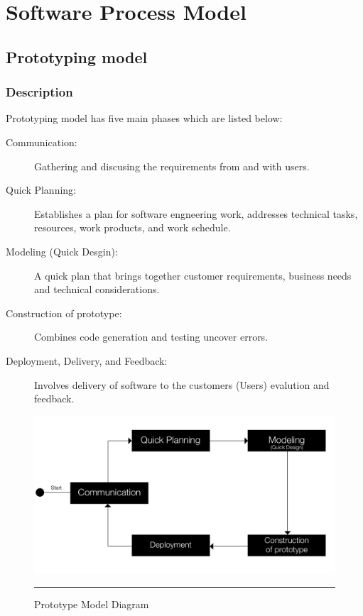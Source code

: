 \chapter{Software Process Model} 

\label{Chapter5} 


\doublespacing


\section{Prototyping model}
\subsection{Description}
Prototyping model has five main phases which are listed below:
\begin{description}
	\item[Communication:] Gathering and discusing the requirements from and with users.
	\item[Quick Planning:] Establishes a plan for software engneering work, addresses technical tasks, resources, work products, and work schedule.
	\item[Modeling (Quick Desgin):] A quick plan that brings together customer requirements, business needs and technical considerations.
	\item[Construction of prototype:] Combines code generation and testing uncover errors.
	\item[Deployment, Delivery, and Feedback:] Involves delivery of software to the customers (Users) evalution and feedback.
\end{description}

\begin{figure}[H]
	\centering
	\includegraphics[scale=0.5]{Figures/PrototypingModel.png}
	\rule{35em}{0.5pt}
	\caption[Prototype Model Diagram]{Prototype Model Diagram}
\end{figure}

